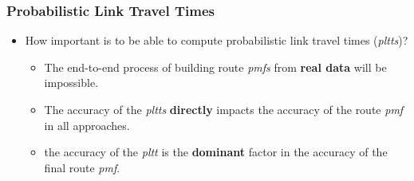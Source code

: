 \documentclass[t]{beamer}
\begin{document}
\begin{frame}\frametitle{Probabilistic Link Travel Times}
\begin{itemize}
\item How important is to be able to compute probabilistic link travel times (\emph{pltts})?
\begin{itemize}
\item<2-> The end-to-end process of building route \emph{pmfs} from \textbf{real data} will be impossible.
\item<3-> The accuracy of the \emph{pltts}  \textbf{directly} impacts the accuracy of the route \emph{pmf} in all approaches.
\item<4-> the accuracy of the \emph{pltt} is the \textbf{dominant} factor in the accuracy of the final route \emph{pmf}.
\end{itemize}
\end{itemize}
\end{frame}
\end{document}

